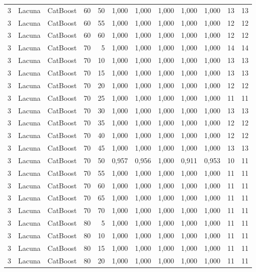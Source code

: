 \begin{longtable}{ccclrrrrrrrr}
3 & Lacuna & CatBoost & 60 & 50 & 1,000 & 1,000 & 1,000 & 1,000 & 1,000 & 13 & 13 \\
3 & Lacuna & CatBoost & 60 & 55 & 1,000 & 1,000 & 1,000 & 1,000 & 1,000 & 12 & 12 \\
3 & Lacuna & CatBoost & 60 & 60 & 1,000 & 1,000 & 1,000 & 1,000 & 1,000 & 12 & 12 \\
3 & Lacuna & CatBoost & 70 & 5 & 1,000 & 1,000 & 1,000 & 1,000 & 1,000 & 14 & 14 \\
3 & Lacuna & CatBoost & 70 & 10 & 1,000 & 1,000 & 1,000 & 1,000 & 1,000 & 13 & 13 \\
3 & Lacuna & CatBoost & 70 & 15 & 1,000 & 1,000 & 1,000 & 1,000 & 1,000 & 13 & 13 \\
3 & Lacuna & CatBoost & 70 & 20 & 1,000 & 1,000 & 1,000 & 1,000 & 1,000 & 12 & 12 \\
3 & Lacuna & CatBoost & 70 & 25 & 1,000 & 1,000 & 1,000 & 1,000 & 1,000 & 11 & 11 \\
3 & Lacuna & CatBoost & 70 & 30 & 1,000 & 1,000 & 1,000 & 1,000 & 1,000 & 13 & 13 \\
3 & Lacuna & CatBoost & 70 & 35 & 1,000 & 1,000 & 1,000 & 1,000 & 1,000 & 12 & 12 \\
3 & Lacuna & CatBoost & 70 & 40 & 1,000 & 1,000 & 1,000 & 1,000 & 1,000 & 12 & 12 \\
3 & Lacuna & CatBoost & 70 & 45 & 1,000 & 1,000 & 1,000 & 1,000 & 1,000 & 13 & 13 \\
3 & Lacuna & CatBoost & 70 & 50 & 0,957 & 0,956 & 1,000 & 0,911 & 0,953 & 10 & 11 \\
3 & Lacuna & CatBoost & 70 & 55 & 1,000 & 1,000 & 1,000 & 1,000 & 1,000 & 11 & 11 \\
3 & Lacuna & CatBoost & 70 & 60 & 1,000 & 1,000 & 1,000 & 1,000 & 1,000 & 11 & 11 \\
3 & Lacuna & CatBoost & 70 & 65 & 1,000 & 1,000 & 1,000 & 1,000 & 1,000 & 11 & 11 \\
3 & Lacuna & CatBoost & 70 & 70 & 1,000 & 1,000 & 1,000 & 1,000 & 1,000 & 11 & 11 \\
3 & Lacuna & CatBoost & 80 & 5 & 1,000 & 1,000 & 1,000 & 1,000 & 1,000 & 11 & 11 \\
3 & Lacuna & CatBoost & 80 & 10 & 1,000 & 1,000 & 1,000 & 1,000 & 1,000 & 11 & 11 \\
3 & Lacuna & CatBoost & 80 & 15 & 1,000 & 1,000 & 1,000 & 1,000 & 1,000 & 11 & 11 \\
3 & Lacuna & CatBoost & 80 & 20 & 1,000 & 1,000 & 1,000 & 1,000 & 1,000 & 11 & 11 \\

\end{longtable}
